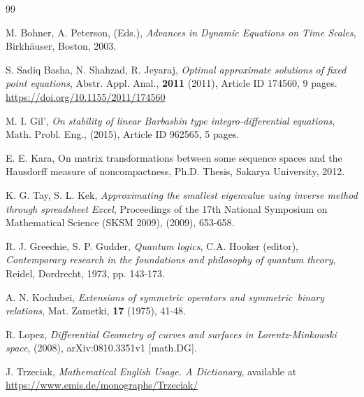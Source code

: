 \documentclass[final, 9pt, onecolumn]{saucis}
\begin{document}
\begin{thebibliography}{99}

 M. Bohner, A. Peterson, (Eds.), \emph{Advances in Dynamic Equations on Time Scales}, Birkh\"{a}user, Boston, 2003.

 S. Sadiq Basha, N. Shahzad, R. Jeyaraj, \emph{Optimal approximate solutions of fixed point equations}, Abstr. Appl. Anal., \textbf{2011} (2011), Article ID 174560, 9 pages. \url{https://doi.org/10.1155/2011/174560}

 M. I. Gil', \emph{On stability of linear Barbashin type integro-differential equations}, Math. Probl. Eng., (2015), Article ID 962565, 5 pages.

 E. E. Kara, On matrix transformations between some sequence spaces and the Hausdorff measure of noncompactness, Ph.D. Thesis, Sakarya University, 2012.

 K. G. Tay, S. L. Kek, \emph{Approximating the smallest eigenvalue using inverse method through spreadsheet Excel}, Proceedings of the 17th National Symposium on Mathematical Science (SKSM 2009), (2009), 653-658.

 R. J. Greechie, S. P. Gudder, \emph{Quantum logics}, C.A. Hooker (editor), {\em Contemporary research in the foundations and philosophy of quantum theory}, Reidel, Dordrecht, 1973,  pp. 143-173.

 A. N. Kochubei, \emph{Extensions of symmetric operators and symmetric\ binary  relations}, Mat. Zametki, \textbf{17} (1975), 41-48.

 R. Lopez, \emph{Differential Geometry of curves and surfaces in Lorentz-Minkowski space}, (2008), arXiv:0810.3351v1 [math.DG].

 J. Trzeciak, \emph{Mathematical English Usage. A Dictionary}, available at
\url{https://www.emis.de/monographs/Trzeciak/}

\end{thebibliography}
\end{document}
